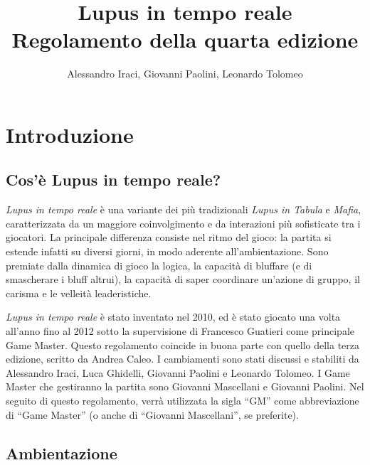 \documentclass[a4paper,10pt]{article}
\title{Lupus in tempo reale\\ Regolamento della quarta edizione}
\author{Alessandro Iraci, Giovanni Paolini, Leonardo Tolomeo}
\begin{document}
\maketitle


\section{Introduzione}

\subsection{Cos'è Lupus in tempo reale?}

\emph{Lupus in tempo reale} è una variante dei più tradizionali \emph{Lupus in Tabula} e \emph{Mafia}, caratterizzata da un maggiore coinvolgimento e da interazioni più sofisticate tra i giocatori.
La principale differenza consiste nel ritmo del gioco: la partita si estende infatti su diversi giorni, in modo aderente all'ambientazione.
Sono premiate dalla dinamica di gioco la logica, la capacità di bluffare (e di smascherare i bluff altrui), la capacità di saper coordinare un’azione di gruppo, il carisma e le velleità leaderistiche.

\emph{Lupus in tempo reale} è stato inventato nel 2010, ed è stato giocato una volta all'anno fino al 2012 sotto la supervisione di Francesco Guatieri come principale Game Master.
Questo regolamento coincide in buona parte con quello della terza edizione, scritto da Andrea Caleo.
I cambiamenti sono stati discussi e stabiliti da Alessandro Iraci, Luca Ghidelli, Giovanni Paolini e Leonardo Tolomeo.
I Game Master che gestiranno la partita sono Giovanni Mascellani e Giovanni Paolini.
Nel seguito di questo regolamento, verrà utilizzata la sigla ``GM'' come abbreviazione di ``Game Master'' (o anche di ``Giovanni Mascellani'', se preferite).

\subsection{Ambientazione}
\end{document}
